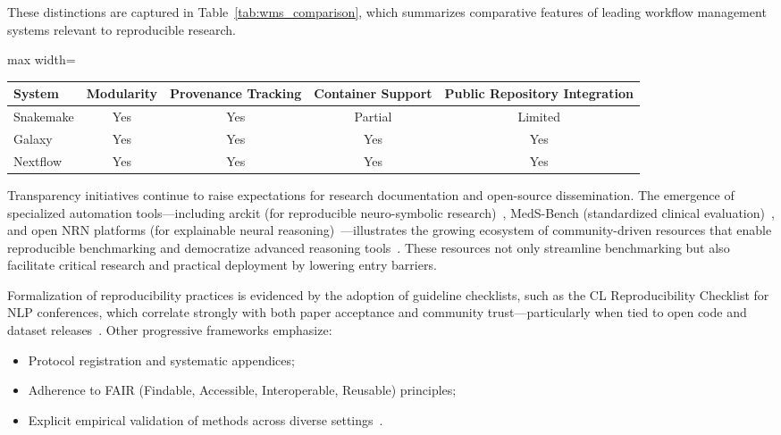 These distinctions are captured in Table~\ref{tab:wms_comparison}, which summarizes comparative features of leading workflow management systems relevant to reproducible research.

\begin{table*}[htbp]
\centering
\caption{Comparative features of widely used workflow management systems supporting reproducible research.}
\label{tab:wms_comparison}
\begin{adjustbox}{max width=\textwidth}
\begin{tabular}{lcccc}
\toprule
\textbf{System} & \textbf{Modularity} & \textbf{Provenance Tracking} & \textbf{Container Support} & \textbf{Public Repository Integration} \\
\midrule
Snakemake & Yes & Yes & Partial & Limited \\
Galaxy    & Yes & Yes & Yes     & Yes    \\
Nextflow  & Yes & Yes & Yes     & Yes    \\
\bottomrule
\end{tabular}
\end{adjustbox}
\end{table*}

Transparency initiatives continue to raise expectations for research documentation and open-source dissemination. The emergence of specialized automation tools---including arckit (for reproducible neuro-symbolic research)~\cite{ref92}, MedS-Bench (standardized clinical evaluation)~\cite{ref95}, and open NRN platforms (for explainable neural reasoning)~\cite{ref93}---illustrates the growing ecosystem of community-driven resources that enable reproducible benchmarking and democratize advanced reasoning tools~\cite{ref65,ref66,ref67,ref71,ref81,ref82,ref87,ref101,ref102,ref104,ref105}. These resources not only streamline benchmarking but also facilitate critical research and practical deployment by lowering entry barriers.

Formalization of reproducibility practices is evidenced by the adoption of guideline checklists, such as the CL Reproducibility Checklist for NLP conferences, which correlate strongly with both paper acceptance and community trust---particularly when tied to open code and dataset releases~\cite{ref108}. Other progressive frameworks emphasize:

\begin{itemize}
  \item Protocol registration and systematic appendices;
  \item Adherence to FAIR (Findable, Accessible, Interoperable, Reusable) principles;
  \item Explicit empirical validation of methods across diverse settings~\cite{ref66,ref67,ref82}.
\end{itemize}

